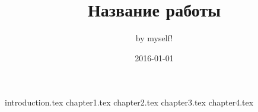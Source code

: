 \documentclass[a4paper,14pt]{extarticle}
\title {Название работы}
\date {2016-01-01}
\author {by myself!}
\begin{document}
	\maketitle
	\clearpage
	\setcounter{page}{2}
	\tableofcontents
	\clearpage
	 {introduction.tex}
	\clearpage
	 {chapter1.tex}
	\clearpage
	 {chapter2.tex}
	\clearpage
	 {chapter3.tex}
	\clearpage
	 {chapter4.tex}
	\clearpage
	\renewcommand{\refname}{Список использованных источников}
	
	
\end{document}
